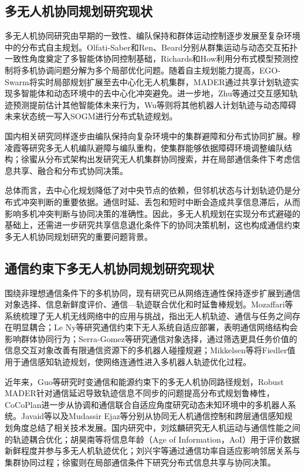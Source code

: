 \subsection{多无人机协同规划研究现状}

多无人机协同研究由早期的一致性、编队保持和群体运动控制逐步发展至复杂环境中的分布式自主规划。Olfati-Saber\cite{olfatisaber2006flocking}和Ren、Beard\cite{ren2005consensus}分别从群集运动与动态交互拓扑一致性角度奠定了多智能体协同控制基础，Richards和How\cite{richards2004dmpc}利用分布式模型预测控制将多机协调问题分解为多个局部优化问题。随着自主规划能力提高，EGO-Swarm\cite{egoSwarm}将实时局部规划扩展至去中心化无人机集群，MADER\cite{mader}通过共享计划轨迹实现多智能体和动态环境中的去中心化冲突避免。进一步地，Zhu等\cite{zhu2021interaction}通过交互感知轨迹预测提前估计其他智能体未来行为，Wu等\cite{wu2024sogm}则将其他机器人计划轨迹与动态障碍未来状态统一写入SOGM进行分布式轨迹规划。

国内相关研究同样逐步由编队保持向复杂环境中的集群避障和分布式协同扩展。穆凌霞等\cite{mu2024formation}研究多无人机编队避障与编队重构，使集群能够依据障碍环境调整编队结构；徐蜜\cite{xu2025search}从分布式架构出发研究无人机集群协同搜索，并在局部通信条件下考虑信息共享、融合和分布式协同决策。

总体而言，去中心化规划降低了对中央节点的依赖，但邻机状态与计划轨迹仍是分布式冲突判断的重要依据。通信时延、丢包和短时中断会造成共享信息滞后，从而影响多机冲突判断与协同决策的准确性。因此，多无人机规划在实现分布式避碰的基础上，还需进一步研究共享信息退化条件下的协同决策机制，这也构成通信约束多无人机协同规划研究的重要问题背景。

\subsection{通信约束下多无人机协同规划研究现状}

围绕非理想通信条件下的多机协同，现有研究已从网络连通性保持逐步扩展到通信对象选择、信息新鲜度评价、通信—轨迹联合优化和时延鲁棒规划。Mozaffari等\cite{mozaffari2019tutorial}系统梳理了无人机无线网络中的应用与挑战，指出无人机轨迹、通信与任务之间存在明显耦合；Le Ny等\cite{leny2012communication}研究通信约束下无人系统自适应部署，表明通信网络结构会影响群体协同行为；Serra-Gomez等\cite{serragomez2020whom}研究通信对象选择，通过筛选更具任务价值的信息交互对象改善有限通信资源下的多机器人碰撞规避；Mikkelsen等\cite{mikkelsenCommunication}将Fiedler值用于通信感知轨迹规划，使网络连通性进入多机器人轨迹优化过程。

近年来，Guo等\cite{guo2024communication}研究时变通信和能源约束下的多无人机协同路径规划，Robust MADER\cite{robustMader}针对通信延迟导致轨迹信息不同步的问题提高分布式规划鲁棒性，CoCoPlan\cite{cocoplan2026}进一步从协调和通信联合自适应角度研究动态未知环境中的多机器人系统。Javaid等\cite{javaid2023communication}以及Mudassir Ejaz等\cite{mudassir2026review}分别从协同无人机通信控制和跨层通信感知规划角度总结了相关技术发展。国内研究中，刘炫麟\cite{liu2025uavcomm}研究无人机运动与通信性能之间的轨迹耦合优化；胡昊南等\cite{hu2024aoi}将信息年龄（Age of Information，AoI）用于评价数据新鲜程度并参与多无人机轨迹优化；刘兴宇等\cite{liu2024power}通过通信功率自适应影响邻居关系与集群协同过程；徐蜜\cite{xu2025search}则在局部通信条件下研究分布式信息共享与协同决策。

